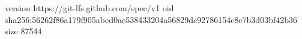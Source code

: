 version https://git-lfs.github.com/spec/v1
oid sha256:56262f86a179f905abed0ae538433204a56829dc92786154e8c7b3d03bf42b36
size 87544

